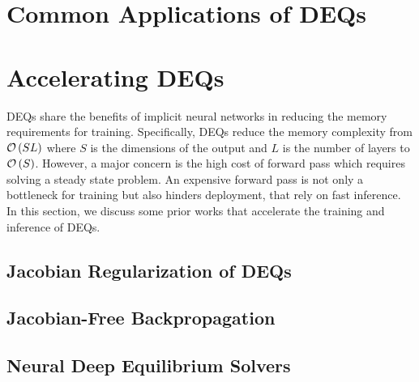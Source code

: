 

\section{Common Applications of DEQs}
\label{sec:common_applications_deqs}

\section{Accelerating DEQs}
\label{sec:accelerating_deqs}

DEQs share the benefits of implicit neural networks in reducing the memory requirements for training. Specifically, DEQs reduce the memory complexity from $\mathcal{O}\left(SL\right)$ where $S$ is the dimensions of the output and $L$ is the number of layers to $\mathcal{O}\left(S\right)$. However, a major concern is the high cost of forward pass which requires solving a steady state problem. An expensive forward pass is not only a bottleneck for training but also hinders deployment, that rely on fast inference. In this section, we discuss some prior works that accelerate the training and inference of DEQs.

\subsection{Jacobian Regularization of DEQs}
\label{subsec:jacobian_regularization_deqs}

\citet{bai2021stabilizing}

\subsection{Jacobian-Free Backpropagation}
\label{subsec:jacobian_free_backpropagation}

\citet{fung2022jfb}

\subsection{Neural Deep Equilibrium Solvers}
\label{subsec:neural_deep_equilibrium_solvers}

\citet{bai2021neural}
